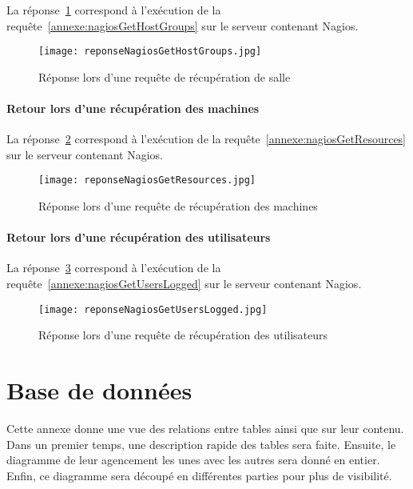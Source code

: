 \begin{appendices}
La r\'eponse~\ref{annexe:reponseNagiosGetHostGroups} correspond \`a l'ex\'ecution de la requ\^ete~\ref{annexe:nagiosGetHostGroups} sur le serveur contenant Nagios.

\begin{figure}[!ht]
	\centering
	\texttt{[image: reponseNagiosGetHostGroups.jpg]}
	\caption{R\'eponse lors d'une requ\^ete de r\'ecup\'eration de salle}
	\label{annexe:reponseNagiosGetHostGroups}

\end{figure}

\subsubsection{Retour lors d'une r\'ecup\'eration des machines}

La r\'eponse~\ref{annexe:reponseNagiosGetResources} correspond \`a l'ex\'ecution de la requ\^ete~\ref{annexe:nagiosGetResources} sur le serveur contenant Nagios.

\begin{figure}[!ht]
	\centering
	\texttt{[image: reponseNagiosGetResources.jpg]}
	\caption{R\'eponse lors d'une requ\^ete de r\'ecup\'eration des machines}
	\label{annexe:reponseNagiosGetResources}

\end{figure}

\subsubsection{Retour lors d'une r\'ecup\'eration des utilisateurs}

La r\'eponse~\ref{annexe:reponseNagiosGetUsersLogged} correspond \`a l'ex\'ecution de la requ\^ete~\ref{annexe:nagiosGetUsersLogged} sur le serveur contenant Nagios.

\begin{figure}[!ht]
	\centering
	\texttt{[image: reponseNagiosGetUsersLogged.jpg]}
	\caption{R\'eponse lors d'une requ\^ete de r\'ecup\'eration des utilisateurs}
	\label{annexe:reponseNagiosGetUsersLogged}

\end{figure}

\chapter{Base de donn\'ees}
\label{chapterAnnexe:baseDeDonnees}

Cette annexe donne une vue des relations entre tables ainsi que sur leur contenu.
Dans un premier temps, une description rapide des tables sera faite.
Ensuite, le diagramme de leur agencement les unes avec les autres sera donn\'e en entier.
Enfin, ce diagramme sera d\'ecoup\'e en diff\'erentes parties pour plus de visibilit\'e.


\end{appendices}
